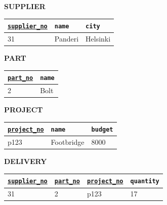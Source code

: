 \begingroup
\setlength{\tabcolsep}{3pt}
\renewcommand{\arraystretch}{1.25}
\begin{minipage}[t]{0.48\linewidth}
\centering\small\textbf{SUPPLIER}\par\smallskip
{\footnotesize\begin{tabular}{@{}lll@{}}
\toprule
\underline{\texttt{supplier\_no}} & \texttt{name} & \texttt{city}\\
\midrule
31 & Panderi & Helsinki\\
\bottomrule
\end{tabular}}
\end{minipage}\hfill
\begin{minipage}[t]{0.48\linewidth}
\centering\small\textbf{PART}\par\smallskip
{\footnotesize\begin{tabular}{@{}ll@{}}
\toprule
\underline{\texttt{part\_no}} & \texttt{name}\\
\midrule
2 & Bolt\\
\bottomrule
\end{tabular}}
\end{minipage}
\par\medskip
\begin{minipage}[t]{0.48\linewidth}
\centering\small\textbf{PROJECT}\par\smallskip
{\footnotesize\begin{tabular}{@{}lll@{}}
\toprule
\underline{\texttt{project\_no}} & \texttt{name} & \texttt{budget}\\
\midrule
p123 & Footbridge & 8000\\
\bottomrule
\end{tabular}}
\end{minipage}\hfill
\begin{minipage}[t]{0.48\linewidth}
\centering\small\textbf{DELIVERY}\par\smallskip
{\footnotesize\begin{tabular}{@{}llll@{}}
\toprule
\underline{\texttt{supplier\_no}} & \underline{\texttt{part\_no}} & \underline{\texttt{project\_no}} & \texttt{quantity}\\
\midrule
31 & 2 & p123 & 17\\
\bottomrule
\end{tabular}}
\end{minipage}
\endgroup
